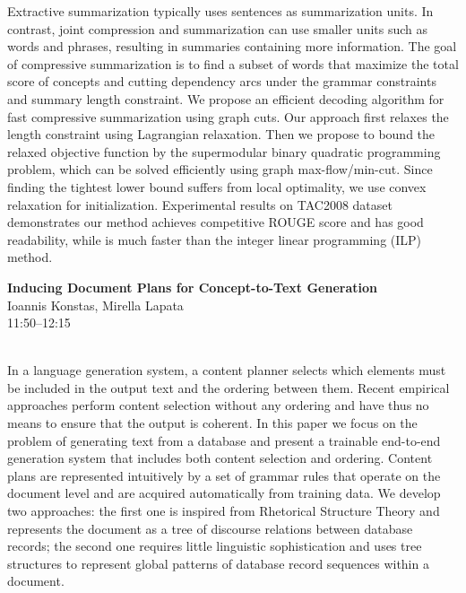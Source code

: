 \documentclass[twoside,makeidx]{book}
\begin{document}
\nopagebreak%
\noindent%
{\small Extractive summarization typically uses sentences as summarization units. In contrast, joint compression and summarization can use smaller units such as words and phrases, resulting in summaries containing more information. The goal of compressive summarization is to find a subset of words that maximize the total score of concepts and cutting dependency arcs under the grammar constraints and summary length constraint. We propose an efficient decoding algorithm for fast compressive summarization using graph cuts. Our approach first relaxes the length constraint using Lagrangian relaxation. Then we propose to bound the relaxed objective function by the supermodular binary quadratic programming problem, which can be solved efficiently using graph max-flow/min-cut. Since finding the tightest lower bound suffers from local optimality, we use convex relaxation for initialization. Experimental results on TAC2008 dataset demonstrates our method achieves competitive ROUGE score and has good readability, while is much faster than the  integer linear programming (ILP) method.}
\par\vspace{2em}\noindent%
\begin{minipage}{\linewidth}%
\begin{center}
\textbf{\normalsize Inducing Document Plans for Concept-to-Text Generation}\\
\normalsize  Ioannis Konstas,  Mirella Lapata\\
{\small 11:50--12:15}\\
\end{center}
\end{minipage}\\[0.5em]
\nopagebreak%
\noindent%
{\small In a language generation system, a content planner selects which   elements must be included in the output text and the ordering   between them. Recent empirical approaches perform content selection   without any ordering and have thus no means to ensure that the   output is coherent.  In this paper we focus on the problem of   generating text from a database and present a trainable end-to-end   generation system that includes both content selection and ordering.   Content plans are represented intuitively by a set of grammar rules   that operate on the document level and are acquired automatically   from training data. We develop two approaches: the first one is   inspired from Rhetorical Structure Theory and represents the   document as a tree of discourse relations between database records;   the second one requires little linguistic sophistication and uses   tree structures to represent global patterns of database record   sequences within a document.}
\end{document}
